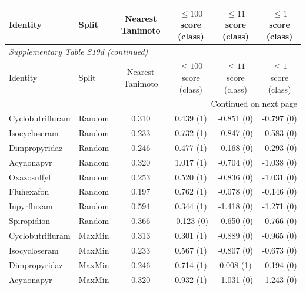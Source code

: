 \begin{longtable}{llcccc}

\toprule Identity & Split & Nearest Tanimoto & $\leq100$ score (class) & $\leq11$ score (class) & $\leq1$ score (class) \\ \midrule\endfirsthead

\multicolumn{6}{l}{\textit{Supplementary Table S19d (continued)}} \\

\toprule Identity & Split & Nearest Tanimoto & $\leq100$ score (class) & $\leq11$ score (class) & $\leq1$ score (class) \\ \midrule\endhead

\midrule\multicolumn{6}{r}{Continued on next page}\\\endfoot\bottomrule\endlastfoot

Cyclobutrifluram & Random & 0.310 & 0.439 (1) & -0.851 (0) & -0.797 (0) \\

Isocycloseram & Random & 0.233 & 0.732 (1) & -0.847 (0) & -0.583 (0) \\

Dimpropyridaz & Random & 0.246 & 0.477 (1) & -0.168 (0) & -0.293 (0) \\

Acynonapyr & Random & 0.320 & 1.017 (1) & -0.704 (0) & -1.038 (0) \\

Oxazosulfyl & Random & 0.253 & 0.520 (1) & -0.836 (0) & -1.031 (0) \\

Fluhexafon & Random & 0.197 & 0.762 (1) & -0.078 (0) & -0.146 (0) \\

Inpyrfluxam & Random & 0.594 & 0.344 (1) & -1.418 (0) & -1.271 (0) \\

Spiropidion & Random & 0.366 & -0.123 (0) & -0.650 (0) & -0.766 (0) \\

Cyclobutrifluram & MaxMin & 0.313 & 0.301 (1) & -0.889 (0) & -0.965 (0) \\

Isocycloseram & MaxMin & 0.233 & 0.567 (1) & -0.807 (0) & -0.673 (0) \\

Dimpropyridaz & MaxMin & 0.246 & 0.714 (1) & 0.008 (1) & -0.194 (0) \\

Acynonapyr & MaxMin & 0.320 & 0.932 (1) & -1.031 (0) & -1.243 (0) \\


\end{longtable}
